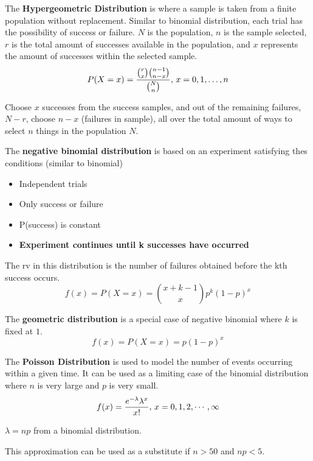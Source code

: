 \documentclass[english, 12pt]{article}
\begin{document}
\begin{defn}
The \textbf{Hypergeometric Distribution} is where a sample is taken from a finite population without replacement. Similar to binomial distribution, each trial has the possibility of success or failure. $N$ is the population, $n$ is the sample selected, $r$ is the total amount of successes available in the population, and $x$ represents the amount of successes within the selected sample.
\[P(X=x) = \frac{\binom{r}{x} \binom{n-1}{n - x}}{\binom{N}{n}},\,x = 0,1,\dots,n\]
\begin{qte}
Choose $x$ successes from the success samples, and out of the remaining failures, $N-r$, choose $n-x$ (failures in sample), all over the total amount of ways to select $n$ things in the population $N$.
\end{qte}
\end{defn}

\begin{defn}
The \textbf{negative binomial distribution} is based on an experiment satisfying thes conditions (similar to binomial)
\begin{itemize}
\item Independent trials
\item Only success or failure
\item P(success) is constant
\item \textbf{Experiment continues until k successes have occurred}
\end{itemize}
The rv in this distribution is the number of failures obtained before the kth success occurs.
\[ f(x) = P(X =x) = \binom{x + k - 1}{x} p^k (1-p)^x\]
\end{defn}

\begin{defn}
The \textbf{geometric distribution} is a special case of negative binomial where $k$ is fixed at $1$.
\[f(x) = P(X=x) = p(1-p)^x\]
\end{defn}

\begin{defn}
The \textbf{Poisson Distribution} is used to model the number of events occurring within a given time. It can be used as a limiting case of the binomial distribution where $n$ is very large and $p$ is very small.
\[f(x) = \frac{e^{-\lambda} \lambda^x}{x!},\, x = 0,1,2,\cdots,\infty\]
\begin{note}
$\lambda = np$ from a binomial distribution.
\end{note}
\begin{qte}
This approximation can be used as a substitute if $n > 50$ and $np < 5$.
\end{qte}
\end{defn}
\end{document}
